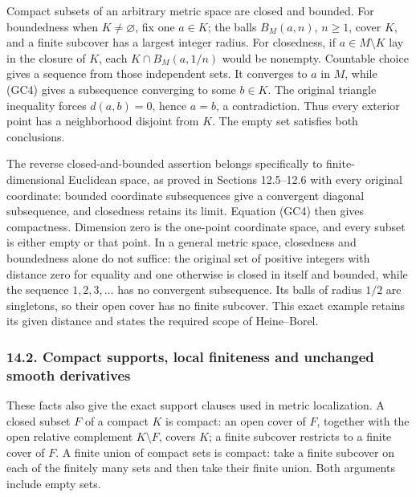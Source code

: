 \documentclass[
  11pt,
]{article}
\begin{document}
Compact subsets of an arbitrary metric space are closed and bounded. For
boundedness when \(K\ne\varnothing\), fix one \(a\in K\); the balls
\(B_M(a,n)\), \(n\geq1\), cover \(K\), and a finite subcover has a
largest integer radius. For closedness, if \(a\in M\setminus K\) lay in
the closure of \(K\), each \(K\cap B_M(a,1/n)\) would be nonempty.
Countable choice gives a sequence from those independent sets. It
converges to \(a\) in \(M\), while (GC4) gives a subsequence converging
to some \(b\in K\). The original triangle inequality forces
\(d(a,b)=0\), hence \(a=b\), a contradiction. Thus every exterior point
has a neighborhood disjoint from \(K\). The empty set satisfies both
conclusions.

The reverse closed-and-bounded assertion belongs specifically to
finite-dimensional Euclidean space, as proved in Sections 12.5--12.6
with every original coordinate: bounded coordinate subsequences give a
convergent diagonal subsequence, and closedness retains its limit.
Equation (GC4) then gives compactness. Dimension zero is the one-point
coordinate space, and every subset is either empty or that point. In a
general metric space, closedness and boundedness alone do not suffice:
the original set of positive integers with distance zero for equality
and one otherwise is closed in itself and bounded, while the sequence
\(1,2,3,\ldots\) has no convergent subsequence. Its balls of radius
\(1/2\) are singletons, so their open cover has no finite subcover. This
exact example retains its given distance and states the required scope
of Heine--Borel.

\subsubsection{14.2. Compact supports, local finiteness and unchanged
smooth
derivatives}\label{compact-supports-local-finiteness-and-unchanged-smooth-derivatives}

These facts also give the exact support clauses used in metric
localization. A closed subset \(F\) of a compact \(K\) is compact: an
open cover of \(F\), together with the open relative complement
\(K\setminus F\), covers \(K\); a finite subcover restricts to a finite
cover of \(F\). A finite union of compact sets is compact: take a finite
subcover on each of the finitely many sets and then take their finite
union. Both arguments include empty sets.
\end{document}
